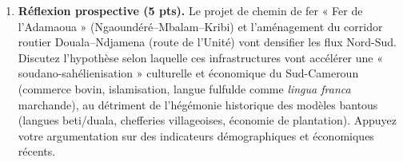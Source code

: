 \documentclass[11pt]{article}
\begin{document}
\begin{exercice}
\begin{enumerate}
    \item \textbf{Réflexion prospective (5 pts).} Le projet de chemin de fer « Fer de l'Adamaoua » (Ngaoundéré--Mbalam--Kribi) et l'aménagement du corridor routier Douala--Ndjamena (route de l'Unité) vont densifier les flux Nord-Sud. Discutez l'hypothèse selon laquelle ces infrastructures vont accélérer une « soudano-sahélienisation » culturelle et économique du Sud-Cameroun (commerce bovin, islamisation, langue fulfulde comme \textit{lingua franca} marchande), au détriment de l'hégémonie historique des modèles bantous (langues beti/duala, chefferies villageoises, économie de plantation). Appuyez votre argumentation sur des indicateurs démographiques et économiques récents.
\end{enumerate}
\end{exercice}
\end{document}
